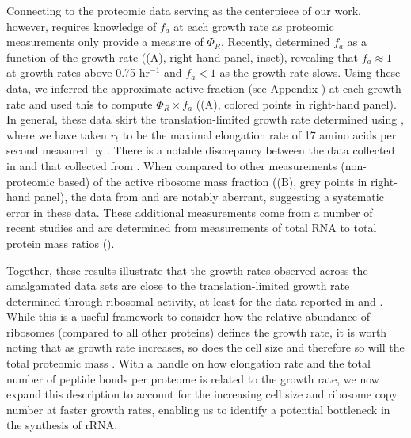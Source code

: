 Connecting  to the proteomic data serving as the centerpiece of
our work, however, requires knowledge
of $f_a$ at each growth rate as proteomic measurements only provide a
measure of $\Phi_R$. Recently, \cite{dai2016} determined $f_a$ as a function of
the growth rate ((A), right-hand panel, inset), revealing
that $f_a \approx 1$ at growth rates above 0.75 hr$^{-1}$ and $f_a < 1$ as the
growth rate slows. Using these data, we inferred the approximate active fraction
(see Appendix ) at each growth rate and used this to compute
$\Phi_R \times f_a$ ((A), colored points in right-hand
panel). In general, these data skirt the translation-limited growth rate
determined using , where we have taken $r_t$ to be the maximal elongation
rate of 17 amino acids per second measured by \cite{dai2016}. There is a notable
discrepancy between the data collected in \cite{schmidt2016, li2014} and that
collected from \cite{valgepea2013, peebo2015}. When compared to other
measurements (non-proteomic based) of the active ribosome mass fraction
((B), grey points in right-hand panel), the data from
\cite{valgepea2013} and \cite{peebo2015} are notably aberrant, suggesting a
systematic error in these data. These additional measurements come from a number
of recent studies and are determined from measurements of total RNA to total
protein mass ratios ().

Together, these results illustrate that the growth rates observed across the
amalgamated data sets are close to the translation-limited growth rate
determined through  ribosomal activity, at least for the data reported in
\cite{schmidt2016} and \cite{li2014}. While this is a useful framework to
consider how the relative abundance of ribosomes (compared to all other
proteins) defines the growth rate, it is worth noting that as growth rate
increases, so does the cell size and therefore so will the total proteomic mass
\citep{basan2015}. With a handle on how elongation rate and the total number of
peptide bonds per proteome is related to the growth rate, we now expand this
description to account for the increasing cell size and ribosome copy number at
faster growth rates,  enabling us to identify a potential bottleneck in the
synthesis of rRNA.

